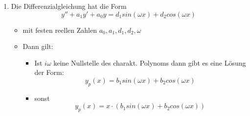 \documentclass[german]{latex4ei/latex4ei_sheet}
\begin{document}
\begin{sectionbox}
\begin{enumerate}
    \item Die Differenzialgleichung hat die Form 
    $$ y'' + a_1 y' + a_0y = d_1 sin(\omega x) + d_2cos(\omega x) $$ 
    \begin{itemize}
        \item mit festen reellen Zahlen $a_0, a_1, d_1, d_2, \omega$
        \item Dann gilt: 
        \begin{itemize}
            \item Ist $i\omega$ keine Nullstelle des charakt. Polynoms dann gibt es eine Lösung der Form: 
            $$ y_p(x) = b_1 sin(\omega x) + b_2 cos(\omega x)$$
            \item sonst
            $$ y_p(x) = x\cdot (b_1 sin(\omega x) + b_2 cos(\omega x))$$
            
        \end{itemize}
    \end{itemize}
\end{enumerate}

\end{sectionbox}

\columnbreak %
\end{document}
